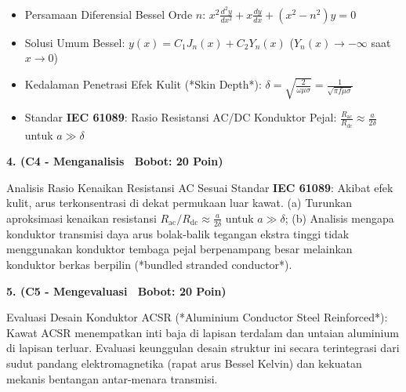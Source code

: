 \documentclass[10pt,a4paper]{article}
\begin{document}
\vfill

\begin{tcolorbox}[colback=unibblue!3,colframe=unibblue,colbacktitle=unibblue,coltitle=white,boxrule=0.6pt,arc=2pt,left=6pt,right=6pt,top=3pt,bottom=3pt,title=\textbf{\scriptsize FORMULA RUJUKAN TEKNIS \& STANDAR INDUSTRI TERKAIT}]
  \scriptsize
  \begin{itemize}[leftmargin=*, nosep]
  \item Persamaan Diferensial Bessel Orde $n$: $x^2 \frac{d^2 y}{dx^2} + x \frac{dy}{dx} + (x^2 - n^2) y = 0$
  \item Solusi Umum Bessel: $y(x) = C_1 J_n(x) + C_2 Y_n(x)$ ($Y_n(x) \to -\infty$ saat $x \to 0$)
  \item Kedalaman Penetrasi Efek Kulit (*Skin Depth*): $\delta = \sqrt{\frac{2}{\omega \mu \sigma}} = \frac{1}{\sqrt{\pi f \mu \sigma}}$
  \item Standar \textbf{IEC 61089}: Rasio Resistansi AC/DC Konduktor Pejal: $\frac{R_{\text{ac}}}{R_{\text{dc}}} \approx \frac{a}{2\delta}$ untuk $a \gg \delta$
\end{itemize}
\end{tcolorbox}

\newpage

\par
\vspace{1mm}

\noindent\textbf{4. (C4 - Menganalisis \textbar\ Bobot: 20 Poin)}\par\vspace{0.8mm}
{\footnotesize Analisis Rasio Kenaikan Resistansi AC Sesuai Standar \textbf{IEC 61089}: Akibat efek kulit, arus terkonsentrasi di dekat permukaan luar kawat. (a) Turunkan aproksimasi kenaikan resistansi $R_{\text{ac}}/R_{\text{dc}} \approx \frac{a}{2\delta}$ untuk $a \gg \delta$; (b) Analisis mengapa konduktor transmisi daya arus bolak-balik tegangan ekstra tinggi tidak menggunakan konduktor tembaga pejal berpenampang besar melainkan konduktor berkas berpilin (*bundled stranded conductor*).}\par

\vspace{3.5mm}

\noindent\textbf{5. (C5 - Mengevaluasi \textbar\ Bobot: 20 Poin)}\par\vspace{0.8mm}
{\footnotesize Evaluasi Desain Konduktor ACSR (*Aluminium Conductor Steel Reinforced*): Kawat ACSR menempatkan inti baja di lapisan terdalam dan untaian aluminium di lapisan terluar. Evaluasi keunggulan desain struktur ini secara terintegrasi dari sudut pandang elektromagnetika (rapat arus Bessel Kelvin) dan kekuatan mekanis bentangan antar-menara transmisi.}\par
\end{document}

